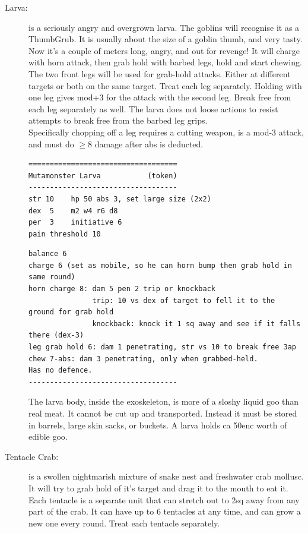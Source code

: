 \begin{description}
\item[Larva:] is a seriously angry and overgrown larva. The goblins will recognise it as a ThumbGrub. It is usually about the size of a goblin thumb, and very tasty. Now it's a couple of meters long, angry, and out for revenge!
It will charge with horn attack, then grab hold with barbed legs, hold and start chewing. The two front legs will be used for grab-hold attacks. Either at different targets or both on the same target. Treat each leg separately. Holding with one leg gives mod+3 for the attack with the second leg. Break free from each leg separately as well. The larva does not loose actions to resist attempts to break free from the barbed leg grips.\\
Specifically chopping off a leg requires a cutting weapon, is a mod-3 attack, and must do $\geq$8 damage after abs is deducted.
\goodbreak \small \begin{samepage} \begin{verbatim}
===================================
Mutamonster Larva           (token)
-----------------------------------
str 10    hp 50 abs 3, set large size (2x2)
dex  5    m2 w4 r6 d8
per  3    initiative 6
pain threshold 10
\end{verbatim} \goodbreak \begin{verbatim}
balance 6
charge 6 (set as mobile, so he can horn bump then grab hold in same round)
horn charge 8: dam 5 pen 2 trip or knockback
               trip: 10 vs dex of target to fell it to the ground for grab hold
               knockback: knock it 1 sq away and see if it falls there (dex-3)
leg grab hold 6: dam 1 penetrating, str vs 10 to break free 3ap
chew 7-abs: dam 3 penetrating, only when grabbed-held.
Has no defence.
-----------------------------------
\end{verbatim} \end{samepage} \normalsize 
The larva body, inside the exoskeleton, is more of a sloshy liquid goo than real meat. It cannot be cut up and transported. Instead it must be stored in barrels, large skin sacks, or buckets. A larva holds ca 50enc worth of edible goo.


\item[Tentacle Crab:] is a swollen nightmarish mixture of snake nest and freshwater crab mollusc. It will try to grab hold of it's target and drag it to the mouth to eat it. Each tentacle is a separate unit that can stretch out to 2sq away from any part of the crab. It can have up to 6 tentacles at any time, and can grow a new one every round. Treat each tentacle separately.


\end{description}
